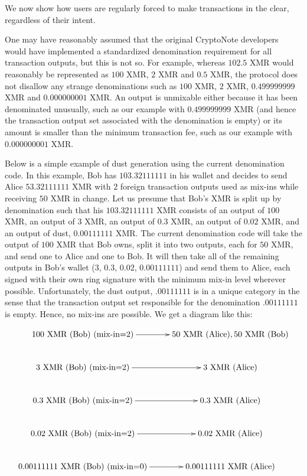 \documentclass[12pt,english]{mrl}
\theoremstyle{definition}
\numberwithin{equation}{section}
\numberwithin{figure}{section}
\numberwithin{equation}{section}
\numberwithin{equation}{section}
\numberwithin{figure}{section}
\begin{document}
We now show how users are regularly forced to make transactions in the clear, regardless of their intent.

One may have reasonably assumed that the original CryptoNote developers would have implemented a standardized denomination requirement for all transaction outputs, but this is not so. For example, whereas $102.5$ XMR would reasonably be represented as $100$ XMR, $2$ XMR and $0.5$ XMR, the protocol does not disallow any strange denominations such as $100$ XMR, $2$ XMR, $0.499999999$ XMR and $0.000000001$ XMR.  An output is unmixable either because it has been denominated unusually, such as our example with $0.499999999$ XMR (and hence the transaction output set associated with the denomination is empty) or its amount is smaller than the minimum transaction fee, such as our example with $0.000000001$ XMR.

Below is a simple example of dust generation using the current denomination code. In this example, Bob has $103.32111111$ in his wallet and decides to send Alice $53.32111111$ XMR with $2$ foreign transaction outputs used as mix-ins while receiving $50$ XMR in change. Let us presume that Bob's XMR is split up by denomination such that his $103.32111111$ XMR consists of an output of $100$ XMR, an output of $3$ XMR, an output of $0.3$ XMR, an output of $0.02$ XMR, and an output of dust, $0.00111111$ XMR. The current denomination code will take the output of $100$ XMR that Bob owns, split it into two outputs, each for $50$ XMR, and send one to Alice and one to Bob. It will then take all of the remaining outputs in Bob's wallet ($3$, $0.3$, $0.02$, $0.00111111$) and send them to Alice, each signed with their own ring signature with the minimum mix-in level wherever possible. Unfortunately, the dust output, $.00111111$ is in a unique category in the sense that the transaction output set responsible for the denomination $.00111111$ is empty. Hence, no mix-ins are possible. We get a diagram like this:

\begin{align}\label{firstExample}
\xymatrix{
100 \text{~XMR~(Bob)~(mix-in=2)}  \ar[r] &50 \text{~XMR~(Alice)}, 50 \text{~XMR~(Bob)}\\
3 \text{~XMR~(Bob)~(mix-in=2)}    \ar[r] & 3 \text{~XMR~(Alice)}\\
0.3 \text{~XMR~(Bob)~(mix-in=2)} \ar[r] &0.3 \text{~XMR~(Alice)}\\
0.02 \text{~XMR~(Bob)~(mix-in=2)} \ar[r] &0.02 \text{~XMR~(Alice)}\\
0.00111111 \text{~XMR~(Bob)~(mix-in=0)} \ar[r] &0.00111111 \text{~XMR (Alice)}
}
\end{align}
  
\end{document}
